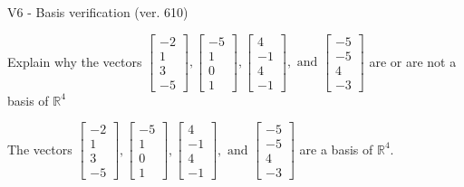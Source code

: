 \begin{exercise}
  \begin{exerciseTitle}V6 - Basis verification (ver. 610)\end{exerciseTitle}
  \begin{exerciseStatement}
    Explain why the vectors \(\left[\begin{array}{r}
-2 \\
1 \\
3 \\
-5
\end{array}\right] , \left[\begin{array}{r}
-5 \\
1 \\
0 \\
1
\end{array}\right] , \left[\begin{array}{r}
4 \\
-1 \\
4 \\
-1
\end{array}\right] , \text{ and } \left[\begin{array}{r}
-5 \\
-5 \\
4 \\
-3
\end{array}\right]\) are or are not a basis of \(\mathbb{R}^4\)	


  \end{exerciseStatement}
  \begin{exerciseAnswer}
   The vectors \(\left[\begin{array}{r}
-2 \\
1 \\
3 \\
-5
\end{array}\right] , \left[\begin{array}{r}
-5 \\
1 \\
0 \\
1
\end{array}\right] , \left[\begin{array}{r}
4 \\
-1 \\
4 \\
-1
\end{array}\right] , \text{ and } \left[\begin{array}{r}
-5 \\
-5 \\
4 \\
-3
\end{array}\right]\) 
  	 are  a basis of \(\mathbb{R}^4\).
  


  \end{exerciseAnswer}
\end{exercise}